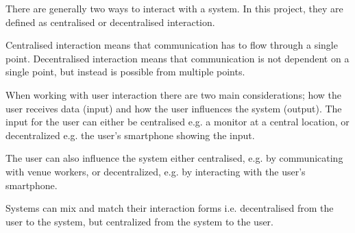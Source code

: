 There are generally two ways to interact with a system. In this project, they are defined as centralised or decentralised interaction.

Centralised interaction means that communication has to flow through a single point.
Decentralised interaction means that communication is not dependent on a single point, but instead is possible from multiple points.



When working with user interaction there are two main considerations; how the user receives data (input) and how the user influences the system (output). The input for the user can either be centralised e.g. a monitor at a central location, or decentralized e.g. the user's smartphone showing the input.

The user can also influence the system either centralised, e.g. by communicating with venue workers, or decentralized, e.g. by interacting with the user's smartphone.

Systems can mix and match their interaction forms i.e. decentralised from the user to the system, but centralized from the system to the user.


